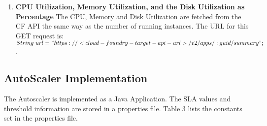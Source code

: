 \documentclass[article,type=msc,colorback,12pt,accentcolor=tud7b,table]{tudthesis}
\begin{document}
\begin{enumerate}
\begin{lstlisting}
int responseCode = con.getResponseCode();
System.out.println("\nSending 'GET' request to URL : " + url);
System.out.println("Response Code : " + responseCode);

if(responseCode == 200){
 BufferedReader in = new BufferedReader(
	new InputStreamReader(con.getInputStream()));
 String inputLine;
 StringBuffer response = new StringBuffer();	
 while ((inputLine = in.readLine()) != null) {
		response.append(inputLine);
 }
 in.close();	
 String respose_str = response.toString();
 double avg_cpu_all_instances = ParseCFJsonResponses
	        .parseJsonGetCPUAvg(respose_str);
 MonitoringService.cpu.add(avg_cpu_all_instances);
}	
\end{lstlisting}
	
	The authorization token to access the API is fetched by making a call to the cf command: $cf oauth-token$. The URL is the CF API end point and the :guid in the URL is the GUID of the application which is retrieved from the Environment variables of the application. The environmnetal variables is accessed by the CF command: $cf env app-name$
	
	\item\textbf{{CPU Utilization, Memory Utilization, and the Disk Utilization as Percentage}} 
	 The CPU, Memory and Disk Utilization are fetched from the CF API the same way as the number of running instances. The URL for this GET request is:  \newline
	$ String\ url = "https://<cloud-foundry-target-api-url>/v2/apps/:guid/summary"; $. 
	
\end{enumerate}	
	
	\subsection{AutoScaler Implementation} 
	
	The Autoscaler is implemented as a Java Application. The SLA values and threshold information are stored in a properties file. Table 3 lists the constants set in the properties file. 
	
\end{document}
